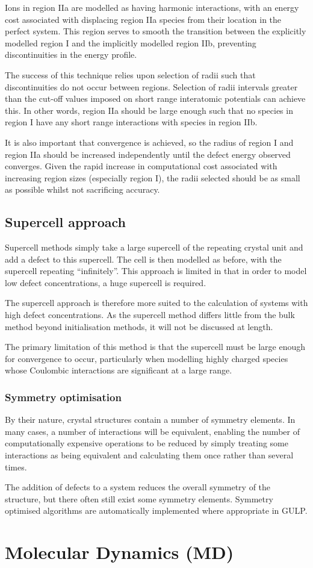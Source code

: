 Ions in region IIa are modelled as having harmonic interactions, with an energy cost associated with displacing region IIa species from their location in the perfect system.
This region serves to smooth the transition between the explicitly modelled region I and the implicitly modelled region IIb, preventing discontinuities in the energy profile.

The success of this technique relies upon selection of radii such that discontinuities do not occur between regions.
Selection of radii intervals greater than the cut-off values imposed on short range interatomic potentials can achieve this.
In other words, region IIa should be large enough such that no species in region I have any short range interactions with species in region IIb.

It is also important that convergence is achieved, so the radius of region I and region IIa should be increased independently until the defect energy observed converges.
Given the rapid increase in computational cost associated with increasing region sizes (especially region I), the radii selected should be as small as possible whilst not sacrificing accuracy.

\subsection{Supercell approach}
Supercell methods simply take a large supercell of the repeating crystal unit and add a defect to this supercell.
The cell is then modelled as before, with the supercell repeating ``infinitely''.
This approach is limited in that in order to model low defect concentrations, a huge supercell is required.

The supercell approach is therefore more suited to the calculation of systems with high defect concentrations.
As the supercell method differs little from the bulk method beyond initialisation methods, it will not be discussed at length.

The primary limitation of this method is that the supercell must be large enough for convergence to occur, particularly when modelling highly charged species whose Coulombic interactions are significant at a large range.

\subsubsection{Symmetry optimisation}
By their nature, crystal structures contain a number of symmetry elements.
In many cases, a number of interactions will be equivalent, enabling the number of computationally expensive operations to be reduced by simply treating some interactions as being equivalent and calculating them once rather than several times.

The addition of defects to a system reduces the overall symmetry of the structure, but there often still exist some symmetry elements.
Symmetry optimised algorithms are automatically implemented where appropriate in GULP.

\section{Molecular Dynamics (MD)}
\label{sec:MD}

